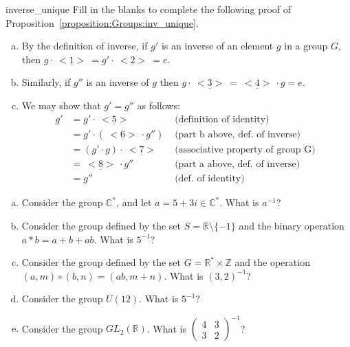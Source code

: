 \begin{exercise}{inverse_unique}
Fill in the blanks to complete the following proof of Proposition~\ref{proposition:Groups:inv_unique}.
\begin{enumerate}[(a)]
\item
By the definition of inverse, if $g'$ is an inverse of an element $g$ in a group $G$, then 
\noindent
$g \cdot \underline{~<1>~} = g' \cdot \underline{~<2>~} = e$.

\item
Similarly, if $g''$ is an inverse of $g$ then  $g \cdot \underline{~<3>~} = \underline{~<4>~} \cdot g = e$. 
\item
We may show that $g' = g''$ as follows:
\begin{align*}
g' & = g' \cdot \underline{~<5>~}  &\text{ (definition of identity) } \\
    & = g' \cdot (\underline{~<6>~} \cdot g'') &\text{ (part b above, def. of inverse) } \\
    & = (g' \cdot g) \cdot \underline{~<7>~}  &\text{ (associative property of group G) } \\
    & = \underline{~<8>~} \cdot g'' &\text{ (part a above, def. of inverse) } \\
    & = g'' &\text{ (def. of identity) }
\end{align*} 
\end{enumerate}
\end{exercise}

\begin{exercise}{39}
\begin{enumerate}[(a)]
\item
Consider the group ${\mathbb C}^{\ast}$, and let  $a = 5 + 3i  \in {\mathbb C}^{\ast}$.  What is $a^{-1}$? 
\item
Consider the group defined by the set $S = {\mathbb R} \setminus \{ -1 \}$ and the binary operation $a \ast b = a + b +ab$.  What is $5^{-1}$? 
\item
Consider the group defined by the set $G = {\mathbb R}^{\ast} \times {\mathbb Z}$ and the operation $(a,m) \circ (b,n) = (ab, m+n)$.  What is $(3,2)^{-1}$?
\item
Consider the group $U(12)$.  What is $5^{-1}$?
\item
Consider the group $GL_2({\mathbb R})$.  What is 
$\begin{pmatrix}
4 & 3 \\
3 & 2
\end{pmatrix}^{-1}$?
\end{enumerate}
\end{exercise}{}

